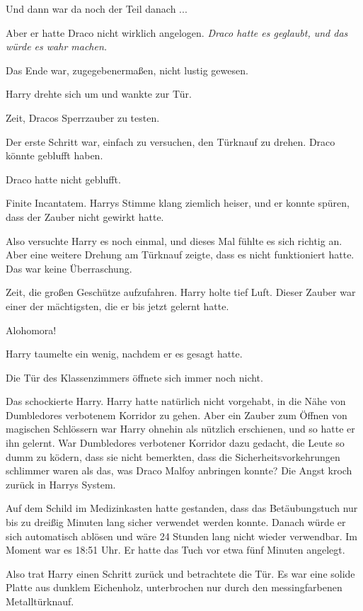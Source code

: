 Und dann war da noch der Teil danach ...

Aber er hatte Draco nicht wirklich angelogen. \emph{Draco hatte es geglaubt, und
das würde es wahr machen.}

Das Ende war, zugegebenermaßen, nicht lustig gewesen.

Harry drehte sich um und wankte zur Tür.

Zeit, Dracos Sperrzauber zu testen.

Der erste Schritt war, einfach zu versuchen, den Türknauf zu drehen. Draco
könnte geblufft haben.

Draco hatte nicht geblufft.

\glqq{}Finite Incantatem.\grqq{} Harrys Stimme klang ziemlich heiser, und er
konnte spüren, dass der Zauber nicht gewirkt hatte.

Also versuchte Harry es noch einmal, und dieses Mal fühlte es sich richtig an.
Aber eine weitere Drehung am Türknauf zeigte, dass es nicht funktioniert hatte.
Das war keine Überraschung.

Zeit, die großen Geschütze aufzufahren. Harry holte tief Luft. Dieser Zauber war
einer der mächtigsten, die er bis jetzt gelernt hatte.

\glqq{}Alohomora!\grqq{}

Harry taumelte ein wenig, nachdem er es gesagt hatte.

Die Tür des Klassenzimmers öffnete sich immer noch nicht.

Das schockierte Harry. Harry hatte natürlich nicht vorgehabt, in die Nähe von
Dumbledores verbotenem Korridor zu gehen. Aber ein Zauber zum Öffnen von
magischen Schlössern war Harry ohnehin als nützlich erschienen, und so hatte er
ihn gelernt. War Dumbledores verbotener Korridor dazu gedacht, die Leute so dumm
zu ködern, dass sie nicht bemerkten, dass die Sicherheitsvorkehrungen schlimmer
waren als das, was Draco Malfoy anbringen konnte? Die Angst kroch zurück in
Harrys System.

Auf dem Schild im Medizinkasten hatte gestanden, dass das Betäubungstuch nur bis
zu dreißig Minuten lang sicher verwendet werden konnte. Danach würde er sich
automatisch ablösen und wäre 24 Stunden lang nicht wieder verwendbar. Im Moment
war es 18:51 Uhr. Er hatte das Tuch vor etwa fünf Minuten angelegt.

Also trat Harry einen Schritt zurück und betrachtete die Tür. Es war eine solide
Platte aus dunklem Eichenholz, unterbrochen nur durch den messingfarbenen
Metalltürknauf.

